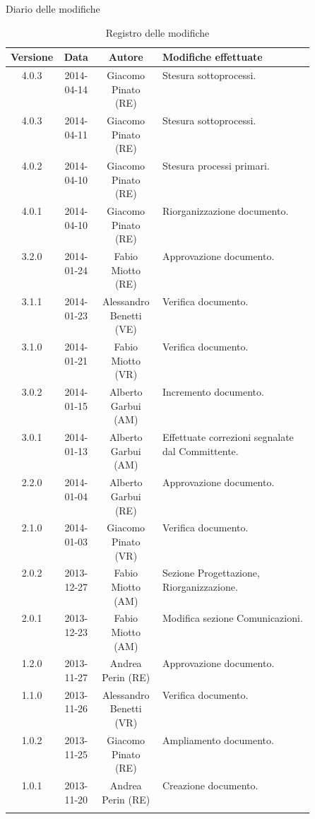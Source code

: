 
\newpage
Diario delle modifiche
\begin{center}
\begin{longtable}{|c|c|c|p{0.5\linewidth}|}
\toprule
\textbf{Versione} & \textbf{Data} & \textbf{Autore} & \textbf{Modifiche effettuate}\\

\midrule
4.0.3 & 2014-04-14 & Giacomo Pinato (RE) & Stesura sottoprocessi.\\
\midrule
4.0.3 & 2014-04-11 & Giacomo Pinato (RE) & Stesura sottoprocessi.\\
\midrule
4.0.2 & 2014-04-10 & Giacomo Pinato (RE) & Stesura processi primari.\\
\midrule
4.0.1 & 2014-04-10 & Giacomo Pinato (RE) & Riorganizzazione documento.\\
\midrule
3.2.0 & 2014-01-24 & Fabio Miotto (RE) & Approvazione documento.\\
\midrule
3.1.1 & 2014-01-23 & Alessandro Benetti (VE) & Verifica documento.\\
\midrule
3.1.0 & 2014-01-21  & Fabio Miotto (VR) & Verifica documento.\\
\midrule
3.0.2 & 2014-01-15 	& Alberto Garbui (AM) & Incremento documento.\\
\midrule
3.0.1 & 2014-01-13	& Alberto Garbui (AM) & Effettuate correzioni segnalate dal Committente.\\
\midrule
2.2.0 &	2014-01-04	& Alberto Garbui (RE) & Approvazione documento.\\
\midrule
2.1.0 &	2014-01-03	& Giacomo Pinato (VR) & Verifica documento.\\
\midrule
2.0.2 & 2013-12-27 & Fabio Miotto (AM) & Sezione Progettazione, Riorganizzazione.\\
\midrule
2.0.1 & 2013-12-23 & Fabio Miotto (AM) & Modifica sezione Comunicazioni.\\
\midrule
1.2.0 & 2013-11-27 & Andrea Perin (RE) & Approvazione documento.\\
\midrule
1.1.0 & 2013-11-26 & Alessandro Benetti (VR) & Verifica documento.\\
\midrule
1.0.2 & 2013-11-25 & Giacomo Pinato (RE) & Ampliamento documento.\\
\midrule
1.0.1 & 2013-11-20 & Andrea Perin (RE) & Creazione documento.\\

\bottomrule
\caption{Registro delle modifiche}
\label{tab:changelog}
\end{longtable}
\end{center}


